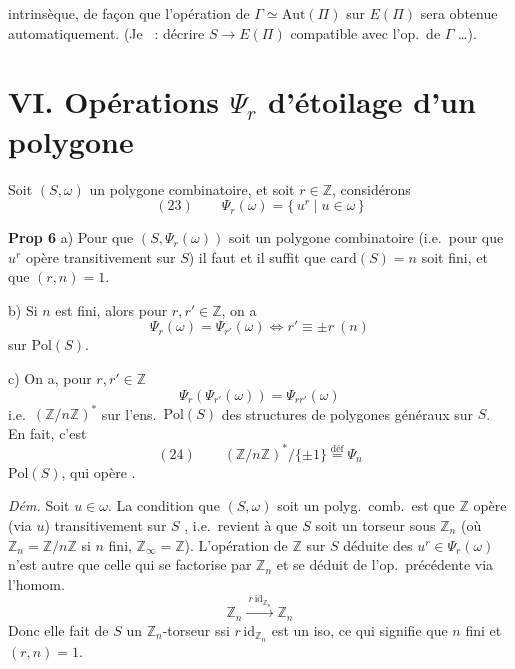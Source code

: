 \documentclass[11pt,a4paper]{article}
\begin{document}

 intrinsèque, de façon que l'opération de $\Gamma \simeq \mathrm{Aut}(\Pi)$ sur $E(\Pi)$ sera obtenue automatiquement. (Je  ~: décrire $S \longrightarrow E(\Pi)$ compatible avec l'op.\ de $\Gamma$ …).

\section{VI. Opérations $\Psi_r$ d'étoilage d'un polygone}

Soit $(S, \omega)$ un polygone combinatoire, et soit $r \in \mathbb{Z}$, considérons
\[
  (23)\qquad \Psi_r(\omega) = \{\, u^{r} \mid u \in \omega \,\}
\]

\textbf{Prop 6} a) Pour que \struck{\ill{}} $(S, \Psi_r(\omega))$ soit un polygone combinatoire (i.e.\ pour que $u^{r}$ opère transitivement sur $S$) il faut et il suffit que  $\mathrm{card}(S) = n$ soit fini, et que $(r, n) = 1$. 

b) Si  $n$ est fini, \struck{\ill{}}  alors pour $r, r' \in \mathbb{Z}$, on a
\[
  \Psi_r(\omega) = \Psi_{r'}(\omega) \iff r' \equiv \pm r \ (n)
\]
  sur $\mathrm{Pol}(S)$.

c) On a, pour $r, r' \in \mathbb{Z}$
\[
  \Psi_r(\Psi_{r'}(\omega)) = \Psi_{rr'}(\omega)
\]
i.e.\ $(\mathbb{Z}/n\mathbb{Z})^{*}$  sur l'ens.\ $\mathrm{Pol}(S)$ des structures de polygones généraux sur $S$. En fait, c'est
\[
  (24)\qquad (\mathbb{Z}/n\mathbb{Z})^{*}/\{\pm 1\} \overset{\text{déf}}{=} \Psi_n
\]
 $\mathrm{Pol}(S)$, qui opère .

\textit{Dém.} \struck{\ill{}} Soit $u \in \omega$. La condition que $(S, \omega)$ soit un polyg.\ comb.\ est que $\mathbb{Z}$ opère (via $u$) transitivement sur $S$ , i.e.\ revient à que $S$ soit un torseur sous $\mathbb{Z}_n$ (où $\mathbb{Z}_n = \mathbb{Z}/n\mathbb{Z}$ si $n$ fini, $\mathbb{Z}_\infty = \mathbb{Z}$).  L'opération de $\mathbb{Z}$ sur $S$ déduite des $u^{r} \in \Psi_r(\omega)$ n'est autre que celle qui se factorise par $\mathbb{Z}_n$ et se déduit de l'op.\ précédente via l'homom.
\[
  \mathbb{Z}_n \xrightarrow{\ r\,\mathrm{id}_{\mathbb{Z}_n}\ } \mathbb{Z}_n
\]
Donc elle fait de $S$ un $\mathbb{Z}_n$-torseur ssi $r\,\mathrm{id}_{\mathbb{Z}_n}$ est un iso, ce qui signifie que $n$ fini et $(r, n) = 1$.
\end{document}
